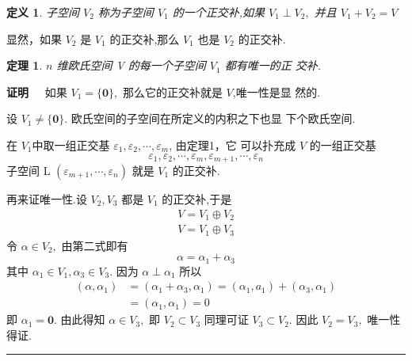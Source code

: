 \documentclass[13pt]{beamer}
\newtheorem{thm}{定理}
\newtheorem*{defi}{定义}
\def\qed{\nopagebreak\hfill{\rule{4pt}{7pt}}\medbreak}
\def\pf{{\bf 证明~~ }}
\begin{document}
\begin{frame}
\begin{defi}
子空间 $V_{2}$ 称为子空间 $V_{1}$ 的一个正交补,如果 $V_{1} \perp V_{2},$ 并且 $V_{1}+V_{2}=V$
\end{defi}
显然，如果 $V_{2}$ 是 $V_{1}$ 的正交补,那么 $V_{1}$ 也是 $V_{2}$ 的正交补.
\end{frame}


\begin{frame}
\begin{thm}
$n$ 维欧氏空间 V 的每一个子空间 $V_{1}$ 都有唯一的正 交补. 
\end{thm}
\pf 如果 $V_{1}=\{\mathbf{0}\},$ 那么它的正交补就是 $V$,唯一性是显
然的.

设 $V_{1} \neq\{\mathbf{0}\} .$ 欧氏空间的子空间在所定义的内积之下也显
下个欧氏空间.

在 $V_1$中取一组正交基 ${\varepsilon}_{1}, {\varepsilon}_{2}, \cdots, {\varepsilon}_{m}$, 由定理1，它
可以扑充成 $V$ 的一组正交基
\[
{\varepsilon}_{1}, {\varepsilon}_{2}, \cdots, {\varepsilon}_{m}, {\varepsilon}_{m+1}, \cdots, {\varepsilon}_{n}
\]
子空间 L $\left({\varepsilon}_{m+1}, \cdots, {\varepsilon}_{n}\right)$ 就是 $V_{1}$ 的正交补.
\end{frame}


\begin{frame}
再来证唯一性.设 $V_{2}, V_{3}$ 都是 $V_{1}$ 的正交补,于是
\[
\begin{array}{l}
V=V_{1} \oplus V_{2} \\
V=V_{1} \oplus V_{3}
\end{array}
\]
令 ${\alpha} \in V_{2},$ 由第二式即有
\[
{\alpha}={\alpha}_{1}+{\alpha}_{3}
\]
其中 ${\alpha}_{1} \in V_{1}, {\alpha}_{3} \in V_{3} .$ 因为 ${\alpha} \perp {\alpha}_{1}$ 所以
\[
\begin{aligned}
\left({\alpha}, {\alpha}_{1}\right) &=\left({\alpha}_{1}+{\alpha}_{3}, {\alpha}_{1}\right)=\left({\alpha}_{1}, {a}_{1}\right)+\left({\alpha}_{3}, {\alpha}_{1}\right) \\
&=\left({\alpha}_{1}, {\alpha}_{1}\right)=0
\end{aligned}
\]
即 ${\alpha}_{1}=\mathbf{0}$. 
由此得知 ${\alpha} \in V_{3},$ 即 $V_{2} \subset V_{3}$
同理可证 $V_{3} \subset V_{2} .$ 因此 $V_{2}=V_{3},$ 唯一性得证. 
\qed

\end{frame}
\end{document}
